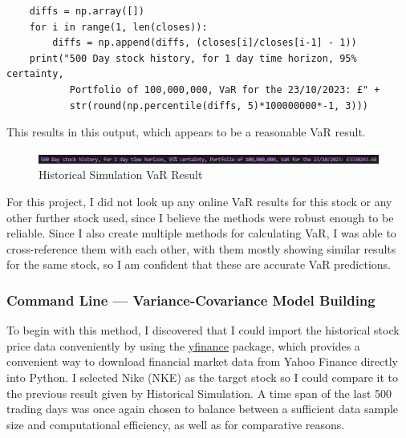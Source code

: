 \documentclass{article}
\begin{document}
  \begin{verbatim}
    diffs = np.array([])
    for i in range(1, len(closes)): 
        diffs = np.append(diffs, (closes[i]/closes[i-1] - 1))
    print("500 Day stock history, for 1 day time horizon, 95% certainty, 
           Portfolio of 100,000,000, VaR for the 23/10/2023: £" + 
           str(round(np.percentile(diffs, 5)*100000000*-1, 3)))
    \end{verbatim}

This results in this output, which appears to be a reasonable VaR result. \\\vspace{0.3cm}

  \begin{figure}[h]
    \centering
    \includegraphics[width=1\textwidth]{Images/Historical Command Line Result.png}
    \caption{Historical Simulation VaR Result}
    \label{fig:Historical Command Line Result}
  \end{figure}

For this project, I did not look up any online VaR results for this stock or any other further stock used, since I believe the methods were robust enough to be reliable. Since I also create multiple methods for calculating VaR, I was able to cross-reference them with each other, with them mostly showing similar results for the same stock, so I am confident that 
these are accurate VaR predictions.

\subsubsection{Command Line --- Variance-Covariance Model Building}

To begin with this method, I discovered that I could import the historical stock price data conveniently by using the \href{https://pypi.org/project/yfinance/}{yfinance} package, which provides a convenient way to download financial market data from Yahoo Finance directly into Python. I selected Nike (NKE) as the target stock so I could compare it to the previous result given by Historical Simulation. A time span of the last 500 trading days was once again chosen to balance between a sufficient data sample size and computational efficiency, as well as for comparative reasons.\\\vspace{0.3cm}
\end{document}

